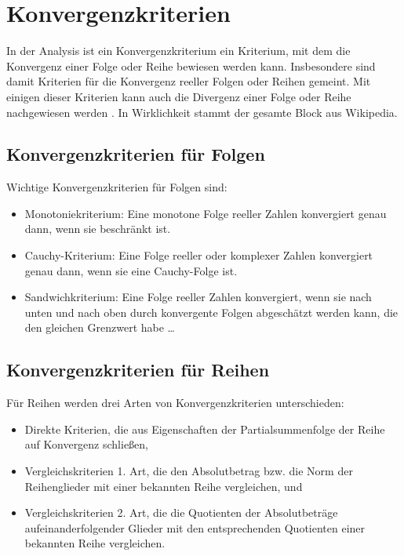 
\chapter{Konvergenzkriterien}
\label{chapter-convergence}

In der Analysis ist ein Konvergenzkriterium ein Kriterium, mit dem die Konvergenz einer Folge oder Reihe bewiesen werden kann. Insbesondere sind damit Kriterien für die Konvergenz reeller Folgen oder Reihen gemeint. Mit einigen dieser Kriterien kann auch die Divergenz einer Folge oder Reihe nachgewiesen werden \cite{confcit}.
In Wirklichkeit stammt der gesamte Block aus Wikipedia.

\section{Konvergenzkriterien für Folgen}

Wichtige Konvergenzkriterien für Folgen sind:
\begin{itemize}  
\item Monotoniekriterium: Eine monotone Folge reeller Zahlen konvergiert genau dann, wenn sie beschränkt ist. 
\item Cauchy-Kriterium: Eine Folge reeller oder komplexer Zahlen konvergiert genau dann, wenn sie eine Cauchy-Folge ist.
\item  Sandwichkriterium: Eine Folge reeller Zahlen konvergiert, wenn sie nach unten und nach oben durch konvergente Folgen abgeschätzt werden kann, die den gleichen Grenzwert habe \ldots 
\end{itemize}

\section{Konvergenzkriterien für Reihen}

Für Reihen werden drei Arten von Konvergenzkriterien unterschieden:
\begin{itemize}
\item Direkte Kriterien, die aus Eigenschaften der Partialsummenfolge der Reihe auf Konvergenz schließen,
\item Vergleichskriterien 1. Art, die den Absolutbetrag bzw. die Norm der Reihenglieder mit einer bekannten Reihe vergleichen, und
\item Vergleichskriterien 2. Art, die die Quotienten der Absolutbeträge aufeinanderfolgender Glieder mit den entsprechenden Quotienten einer bekannten Reihe vergleichen.
\end{itemize}


